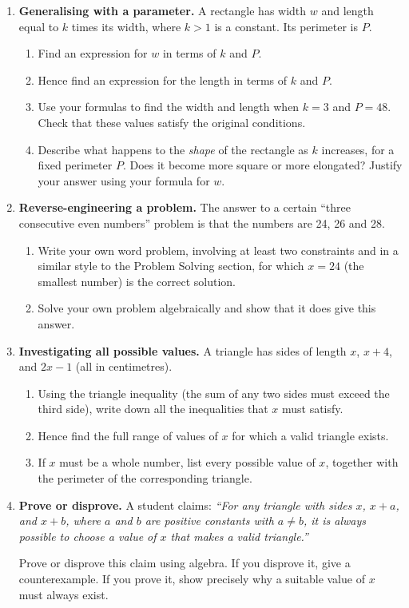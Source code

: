 \documentclass[11pt]{article}
\newcommand{\qspace}{\vspace{1.0cm}}
\begin{document}
\begin{enumerate}
  \item \textbf{Generalising with a parameter.} A rectangle has width $w$ and length equal to $k$ times its width, where $k > 1$ is a constant. Its perimeter is $P$.
  \begin{enumerate}
    \item Find an expression for $w$ in terms of $k$ and $P$.
    \item Hence find an expression for the length in terms of $k$ and $P$.
    \item Use your formulas to find the width and length when $k = 3$ and $P = 48$. Check that these values satisfy the original conditions.
    \item Describe what happens to the \emph{shape} of the rectangle as $k$ increases, for a fixed perimeter $P$. Does it become more square or more elongated? Justify your answer using your formula for $w$.
  \end{enumerate}
  \qspace

  \item \textbf{Reverse-engineering a problem.} The answer to a certain ``three consecutive even numbers'' problem is that the numbers are 24, 26 and 28.
  \begin{enumerate}
    \item Write your own word problem, involving at least two constraints and in a similar style to the Problem Solving section, for which $x = 24$ (the smallest number) is the correct solution.
    \item Solve your own problem algebraically and show that it does give this answer.
  \end{enumerate}
  \qspace

  \item \textbf{Investigating all possible values.} A triangle has sides of length $x$, $x + 4$, and $2x - 1$ (all in centimetres).
  \begin{enumerate}
    \item Using the triangle inequality (the sum of any two sides must exceed the third side), write down all the inequalities that $x$ must satisfy.
    \item Hence find the full range of values of $x$ for which a valid triangle exists.
    \item If $x$ must be a whole number, list every possible value of $x$, together with the perimeter of the corresponding triangle.
  \end{enumerate}
  \qspace

  \item \textbf{Prove or disprove.} A student claims: \textit{``For any triangle with sides $x$, $x+a$, and $x+b$, where $a$ and $b$ are positive constants with $a \neq b$, it is always possible to choose a value of $x$ that makes a valid triangle.''}

  Prove or disprove this claim using algebra. If you disprove it, give a counterexample. If you prove it, show precisely why a suitable value of $x$ must always exist.
  \qspace
\end{enumerate}
\end{document}
